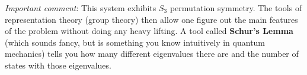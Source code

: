 \documentclass[12pt]{article}
\numberwithin{equation}{subsection}    %
\begin{document}
\emph{Important comment}: This system exhibits $S_3$ permutation symmetry. The tools of representation theory (group theory) then allow one figure out the main features of the problem without doing any heavy lifting. A tool called \textbf{Schur's Lemma} (which sounds fancy, but is something you know intuitively in quantum mechanics) tells you how many different eigenvalues there are and the number of states with those eigenvalues. 
\end{document}
